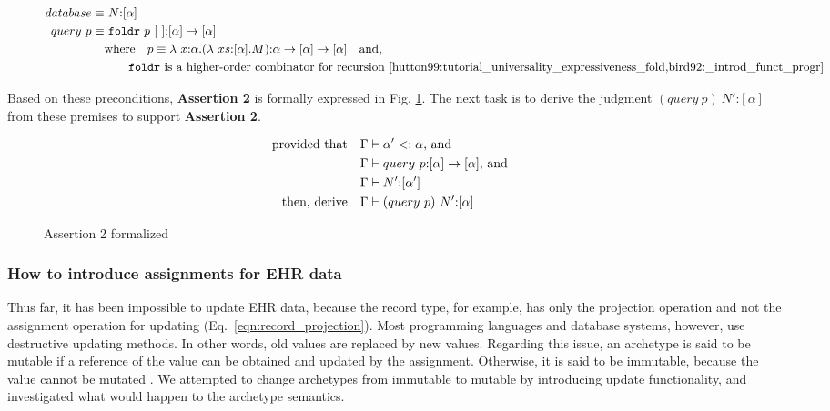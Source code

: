 \documentclass[preprint,3p,onecolumn,times,review]{article}
\begin{document}
{\begin{figure}[!htbp]
\begin{alignat}{3}
   database \equiv & ~ N \text{:} [\alpha] \label{eqn:database_as_list}\\
   query~p  \equiv & ~ \mathtt{foldr} ~ p ~[~] \text{:} [\alpha] \rightarrow [\alpha] \label{eqn:query_by_foldr}\\
           & \text{where}  \quad   p \equiv \lambda~x\text{:}\alpha.(\lambda~xs\text{:}[\alpha].M) \text{:} \alpha \rightarrow [\alpha] \rightarrow [\alpha] \label{eqn:user_level_query} \quad \text{and,}\\
                  & \qquad   \text{{\tt foldr} is a higher-order combinator for recursion \cite{hutton99:tutorial_universality_expressiveness_fold,bird92:_introd_funct_progr}} \nonumber
\end{alignat}
\end{figure}


Based on these preconditions, {\bf Assertion 2} is formally expressed in Fig. \ref{fig:formalized_second_assertion}. The next task is to derive the judgment $(query~p)~N' \text{:} [\alpha] $ from these premises to support {\bf Assertion 2}.

\begin{figure}[!htbp]
\begin{alignat}{3}
  \text{provided that\quad}   & \Gamma \vdash \alpha' <: \alpha \text{, and}~ \\
                              & \Gamma \vdash query~p\text{:}[\alpha] \rightarrow [\alpha]\text{, and}~ \\
                              & \Gamma \vdash  N'\text{:}[\alpha'] \\
  \text{then, derive\quad} & \Gamma \vdash (query~p)~N' \text{:}[\alpha] ~ & 
\end{alignat}
\caption{Assertion 2 formalized}\label{fig:formalized_second_assertion}
\end{figure}


\subsubsection{How to introduce assignments for EHR data \label{sec:howto_introduce_assignments}}

Thus far, it has been impossible to update EHR data, because the record type, for example, has only the projection operation and not the assignment operation for updating (Eq.~\ref{eqn:record_projection}).
Most programming languages and database systems, however, use destructive updating methods. In other words, old values are replaced by new values. 
Regarding this issue, an archetype is said to be mutable if a reference of the value can be obtained and updated by the assignment. Otherwise, it is said to be immutable, because the value cannot be mutated \cite[p.295]{harper13:_pract_found_progr_languag}.
We attempted to change archetypes from immutable to mutable by introducing update functionality, and investigated what would happen to the archetype semantics.

}
\end{document}
